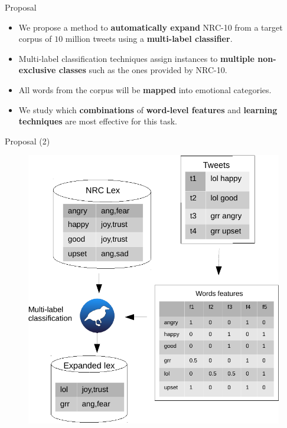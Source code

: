 \documentclass[handout]{beamer}
\begin{document}
\begin{frame}{Proposal}
\begin{scriptsize}
\begin{itemize}
\item  We propose a method to \textbf{automatically expand} NRC-10 from  a target corpus of $10$ million tweets using a \textbf{multi-label classifier}. 

\item Multi-label classification techniques assign instances to \textbf{multiple non-exclusive classes} such as the ones provided by NRC-10.

\item All words from the corpus will be \textbf{mapped} into emotional categories.

\item We study which \textbf{combinations} of \textbf{word-level features} and \textbf{learning techniques} are most effective for this task. 
\end{itemize}
\end{scriptsize}

\end{frame}

\begin{frame}{Proposal (2)}

  \begin{figure}[htb]
	\centering
	 \includegraphics[scale=0.5]{pics/emo_model.pdf}
\end{figure}

\end{frame}
\end{document}
